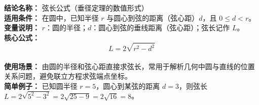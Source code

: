 \textbf{结论名称：} 弦长公式（垂径定理的数值形式）\\
\textbf{适用条件：} 在圆中，已知半径 \( r \) 与圆心到弦的距离（弦心距）\( d \)，且 \( 0 \le d < r \)。\\
\textbf{变量说明：} \( r \)：圆的半径；\( d \)：圆心到弦的垂线距离（弦心距）；弦长记作 \( L \)。\\
\textbf{核心公式：}\
\[
\boxed{L = 2\sqrt{r^{2} - d^{2}}}
\]\\
\textbf{使用场景：} 由圆的半径和弦心距直接求弦长，常用于解析几何中圆与直线的位置关系问题，避免联立方程求弦端点坐标。\\
\textbf{简单例子：} 已知圆半径 \( r = 5 \)，圆心到某弦的距离 \( d = 3 \)，则弦长 \( L = 2\sqrt{5^{2} - 3^{2}} = 2\sqrt{25 - 9} = 2\sqrt{16} = 8 \)。